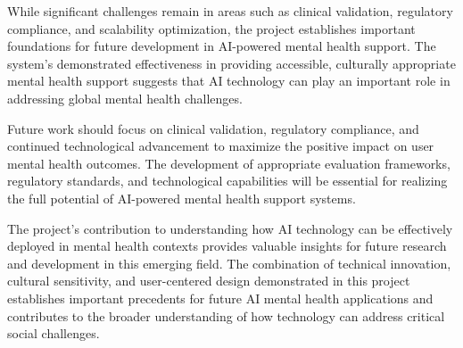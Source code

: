 While significant challenges remain in areas such as clinical validation, regulatory compliance, and scalability optimization, the project establishes important foundations for future development in AI-powered mental health support. The system's demonstrated effectiveness in providing accessible, culturally appropriate mental health support suggests that AI technology can play an important role in addressing global mental health challenges.

Future work should focus on clinical validation, regulatory compliance, and continued technological advancement to maximize the positive impact on user mental health outcomes. The development of appropriate evaluation frameworks, regulatory standards, and technological capabilities will be essential for realizing the full potential of AI-powered mental health support systems.

The project's contribution to understanding how AI technology can be effectively deployed in mental health contexts provides valuable insights for future research and development in this emerging field. The combination of technical innovation, cultural sensitivity, and user-centered design demonstrated in this project establishes important precedents for future AI mental health applications and contributes to the broader understanding of how technology can address critical social challenges. 